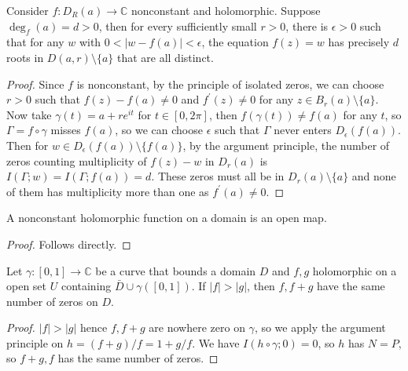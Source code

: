 \begin{theorem}
    Consider $f:D_R(a)\to\mathbb C$ nonconstant and holomorphic.
    Suppose $\deg_f(a)=d>0$, then for every sufficiently small $r>0$, there is $\epsilon>0$ such that for any $w$ with $0<|w-f(a)|<\epsilon$, the equation $f(z)=w$ has precisely $d$ roots in $D(a,r)\setminus\{a\}$ that are all distinct.
\end{theorem}
\begin{proof}
    Since $f$ is nonconstant, by the principle of isolated zeros, we can choose $r>0$ such that $f(z)-f(a)\neq 0$ and $f^\prime(z)\neq 0$ for any $z\in B_r(a)\setminus\{a\}$.
    Now take $\gamma(t)=a+re^{it}$ for $t\in [0,2\pi]$, then $f(\gamma(t))\neq f(a)$ for any $t$, so $\Gamma=f\circ\gamma$ misses $f(a)$, so we can choose $\epsilon$ such that $\Gamma$ never enters $D_\epsilon(f(a))$.
    Then for $w\in D_\epsilon(f(a))\setminus\{f(a)\}$, by the argument principle, the number of zeros counting multiplicity of $f(z)-w$ in $D_r(a)$ is $I(\Gamma;w)=I(\Gamma;f(a))=d$.
    These zeros must all be in $D_r(a)\setminus\{a\}$ and none of them has multiplicity more than one as $f^\prime(a)\neq 0$.
\end{proof}
\begin{corollary}
    A nonconstant holomorphic function on a domain is an open map.
\end{corollary}
\begin{proof}
    Follows directly.
\end{proof}
\begin{theorem}
    Let $\gamma:[0,1]\to\mathbb C$ be a curve that bounds a domain $D$ and $f,g$ holomorphic on a open set $U$ containing $\bar D\cup\gamma([0,1])$.
    If $|f|>|g|$, then $f,f+g$ have the same number of zeros on $D$.
\end{theorem}
\begin{proof}
    $|f|>|g|$ hence $f,f+g$ are nowhere zero on $\gamma$, so we apply the argument principle on $h=(f+g)/f=1+g/f$.
    We have $I(h\circ\gamma;0)=0$, so $h$ has $N=P$, so $f+g,f$ has the same number of zeros.
\end{proof}